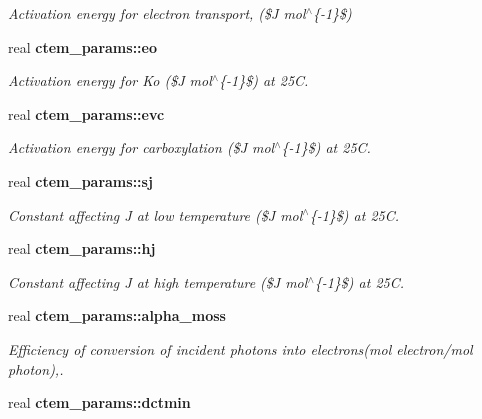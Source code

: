 \begin{DoxyCompactItemize}
\begin{DoxyCompactList}\small\item\em Activation energy for electron transport, (\$\+J mol$^\wedge$\{-\/1\}\$) \end{DoxyCompactList}\item 
\hypertarget{namespacectem__params_aaa562bfa9890e55635269514ceb4be0f}{}real {\bfseries ctem\+\_\+params\+::eo}\label{namespacectem__params_aaa562bfa9890e55635269514ceb4be0f}

\begin{DoxyCompactList}\small\item\em Activation energy for Ko (\$\+J mol$^\wedge$\{-\/1\}\$) at 25\+C. \end{DoxyCompactList}\item 
\hypertarget{namespacectem__params_a89f58555296ce18bb1ffa12e2360aadf}{}real {\bfseries ctem\+\_\+params\+::evc}\label{namespacectem__params_a89f58555296ce18bb1ffa12e2360aadf}

\begin{DoxyCompactList}\small\item\em Activation energy for carboxylation (\$\+J mol$^\wedge$\{-\/1\}\$) at 25\+C. \end{DoxyCompactList}\item 
\hypertarget{namespacectem__params_a1c43450205b241741e92f1803204cb74}{}real {\bfseries ctem\+\_\+params\+::sj}\label{namespacectem__params_a1c43450205b241741e92f1803204cb74}

\begin{DoxyCompactList}\small\item\em Constant affecting J at low temperature (\$\+J mol$^\wedge$\{-\/1\}\$) at 25\+C. \end{DoxyCompactList}\item 
\hypertarget{namespacectem__params_aa10d8d4d4da4b27eef7ae2430a8c7ae7}{}real {\bfseries ctem\+\_\+params\+::hj}\label{namespacectem__params_aa10d8d4d4da4b27eef7ae2430a8c7ae7}

\begin{DoxyCompactList}\small\item\em Constant affecting J at high temperature (\$\+J mol$^\wedge$\{-\/1\}\$) at 25\+C. \end{DoxyCompactList}\item 
\hypertarget{namespacectem__params_ae90073ba7316ac9a569f0a8a97dd81d9}{}real {\bfseries ctem\+\_\+params\+::alpha\+\_\+moss}\label{namespacectem__params_ae90073ba7316ac9a569f0a8a97dd81d9}

\begin{DoxyCompactList}\small\item\em Efficiency of conversion of incident photons into electrons(mol electron/mol photon),. \end{DoxyCompactList}\item 
\hypertarget{namespacectem__params_aa98fb2b4f1bd31eac28fcbb8ab6d8667}{}real {\bfseries ctem\+\_\+params\+::dctmin}\label{namespacectem__params_aa98fb2b4f1bd31eac28fcbb8ab6d8667}


\end{DoxyCompactItemize}
